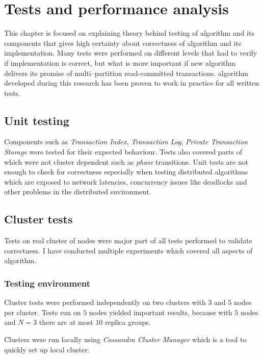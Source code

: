 
\chapter{Tests and performance analysis}\label{chapter:testing}

This chapter is focused on explaining theory behind testing of \mpt algorithm and its components that gives high certainty about correctness of algorithm and its implementation. Many tests were performed on different levels that had to verify if implementation is correct, but what is more important if new \mpt algorithm delivers its promise of multi--partition read-committed transactions. 
\mpt algorithm developed during this research has been proven to work in practice for all written tests. 

\section{Unit testing}
Components such as \emph{Transaction Index}, \emph{Transaction Log}, \emph{Private Transaction Storage} were  tested for their expected behaviour. Tests also covered parts of \mpt which were not cluster dependent such as \emph{phase} transitions. Unit tests are not enough to check for correctness especially when testing distributed algorithms which are  exposed to network latencies, concurrency issues like deadlocks and other problems in the distributed environment. 

\section{Cluster tests}
Tests on real cluster of nodes were major part of all tests performed to validate \mpt correctness. I have conducted multiple experiments which covered all aspects of \mpt algorithm. 

\subsection{Testing environment}
Cluster tests were performed independently on two clusters with $3$ and $5$ nodes per cluster. Tests run on $5$ nodes yielded important results, because with $5$ nodes and $N=3$ there are at most $10$ replica groups. 

Clusters were run locally using \emph{Cassandra Cluster Manager} which is a tool to quickly set up local cluster.

